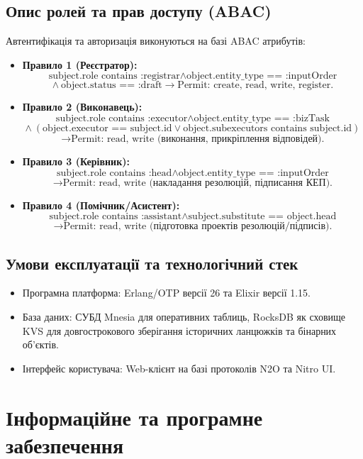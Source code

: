 \documentclass{article}
\begin{document}
\subsection{Опис ролей та прав доступу (ABAC)}
Автентифікація та авторизація виконуються на базі ABAC атрибутів:
\begin{itemize}
    \item \textbf{Правило 1 (Реєстратор):}
    $$\text{subject.role contains :registrar} \land \text{object.entity\_type == :inputOrder}$$
    $$\land\ \text{object.status == :draft} \rightarrow \text{Permit: create, read, write, register.}$$
    \item \textbf{Правило 2 (Виконавець):}
    $$\text{subject.role contains :executor} \land \text{object.entity\_type == :bizTask}$$
    $$\land\ (\text{object.executor == subject.id} \lor \text{object.subexecutors contains subject.id})$$
    $$\rightarrow \text{Permit: read, write (виконання, прикріплення відповідей).}$$
    \item \textbf{Правило 3 (Керівник):}
    $$\text{subject.role contains :head} \land \text{object.entity\_type == :inputOrder}$$
    $$\rightarrow \text{Permit: read, write (накладання резолюцій, підписання КЕП).}$$
    \item \textbf{Правило 4 (Помічник/Асистент):}
    $$\text{subject.role contains :assistant} \land \text{subject.substitute == object.head}$$
    $$\rightarrow \text{Permit: read, write (підготовка проектів резолюцій/підписів).}$$
\end{itemize}

\subsection{Умови експлуатації та технологічний стек}
\begin{itemize}
    \item Програмна платформа: Erlang/OTP версії 26 та Elixir версії 1.15.
    \item База даних: СУБД Mnesia для оперативних таблиць, RocksDB як сховище KVS для довгострокового зберігання історичних ланцюжків та бінарних об'єктів.
    \item Інтерфейс користувача: Web-клієнт на базі протоколів N2O та Nitro UI.
\end{itemize}

\newpage
\section{Інформаційне та програмне забезпечення}
\end{document}
